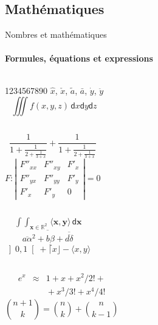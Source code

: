 \documentclass{beamer}
\begin{document}
\subsection{Mathématiques}
\begin{frame}[label=math]{Nombres et mathématiques}
\framesubtitle{Formules, équations et expressions}
\begin{columns}[onlytextwidth]
    1234567890
    $\hat{x}$, $\check{x}$, $\tilde{a}$,
    $\bar{a}$, $\dot{y}$, $\ddot{y}$
    $$ \iiint f(x,y,z)\,\mathsf{d}x\mathsf{d}y\mathsf{d}z$$
\end{columns}
\begin{columns}[onlytextwidth]
    $$\frac{1}{\displaystyle 1+
    \frac{1}{\displaystyle 2+
    \frac{1}{\displaystyle 3+x}}} +
    \frac{1}{1+\frac{1}{2+\frac{1}{3+x}}}$$
    $$F:\left| \begin{array}{ccc}
    F''_{xx} & F''_{xy} &  F'_x \\
    F''_{yx} & F''_{yy} &  F'_y \\
    F'_x     & F'_y     & 0
    \end{array}\right| = 0$$
\end{columns}
\begin{columns}[onlytextwidth]
    $$\mathop{\int \!\!\! \int}_{\mathbf{x} \in \mathbb{R}^2}
    \! \langle \mathbf{x},\mathbf{y}\rangle\,\mathsf{d}\mathbf{x}$$
    $$\overline{\overline{a\alpha}^2+\underline{b\beta}
    +\overline{\overline{d\delta}}}$$
    $\left] 0,1\right[ + \lceil x \rfloor - \langle x,y\rangle$
\end{columns}
\begin{columns}[onlytextwidth]
    \begin{eqnarray*}
    e^x &\approx& 1+x+x^2/2! + \\
        && {}+x^3/3! + x^4/4!
    \end{eqnarray*}
    $${n+1\choose k} = {n\choose k} + {n \choose k-1}$$
\end{columns}
\end{frame}
\end{document}
